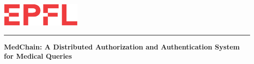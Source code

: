 
%        




\newcommand{\logoepfl}[0]{
  \begin{center}
    \includegraphics[width=4cm]{logo_epfl_coul.eps}
  \end{center}
  \vspace{0.3cm}
  \hrule
}
\newcommand{\project}[1]{
  \begin{center}
    \large{#1}
  \end{center}
  \vspace{1cm}
}
\newcommand{\department}[1]{
  \begin{center}
    \large{#1}
  \end{center}
}
\newcommand{\lab}[1]{
  \begin{center}
    \large{#1}
  \end{center}
}
\newcommand{\supervisor}[3]{
  \begin{center}
    \begin{normalsize}{
        \bf #1}\\#2\\#3
    \end{normalsize}
  \end{center}
}
\renewcommand{\author}[1]{
  \begin{center}
    \Large{#1}
  \end{center}
  \vspace{0.5cm}
}
\renewcommand{\title}[1]{
  \vspace{3cm}
  \begin{center}
    \huge{#1}
  \end{center}
  \vspace{1.7cm}
}
\renewcommand{\date}[2]{
  \begin{center}
    \normalsize{#1 #2}
  \end{center}
  \vspace{0.5cm}
}


\thispagestyle{empty}


  \logoepfl
  
  \title{\textbf{MedChain: A Distributed Authorization and Authentication System for Medical Queries}}
  
